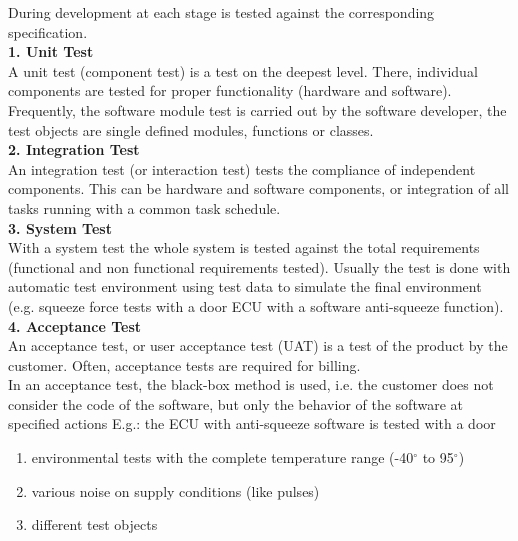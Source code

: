 During development at each stage is tested against the corresponding specification.\\

\textbf{1. Unit Test}\\

A unit test (component test) is a test on the deepest level. There, individual components are tested for proper functionality (hardware and software). Frequently, the software module test is carried out by the software developer, the test objects are single defined modules, functions or classes.\\

\textbf{2. Integration Test}\\

An integration test (or interaction test) tests the compliance of independent components. This can be hardware and software components, or integration of all tasks running with a common task schedule.\\

\textbf{3. System Test}\\

With a system test the whole system is tested against the total requirements (functional and non functional requirements tested). Usually the test is done with automatic test environment using test data to simulate the final environment (e.g. squeeze force tests with a door ECU with a software anti-squeeze function).\\

\textbf{ 4. Acceptance Test}\\

An acceptance test, or user acceptance test (UAT) is a test of the product by the customer. Often, acceptance tests are required for billing. \\
In an acceptance test, the black-box method is used, i.e. the customer does not consider the code of the software, but only the behavior of the software at specified actions E.g.: the ECU with anti-squeeze software is tested with a door

\begin{enumerate}
\item  environmental tests with the complete temperature range (-40$\mathrm{{}^\circ}$ to 95$\mathrm{{}^\circ}$)
\item  various noise on supply conditions (like pulses)
\item  different test objects
\end{enumerate}

